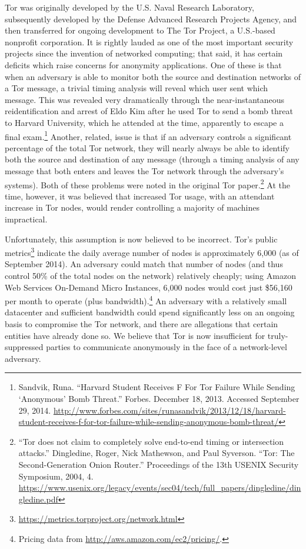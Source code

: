 \documentclass[12pt]{article}
\begin{document}
  Tor was originally developed by the U.S. Naval Research Laboratory, subsequently developed by the Defense Advanced Research Projects Agency, and then transferred for ongoing development to The Tor Project, a U.S.-based nonprofit corporation. It is rightly lauded as one of the most important security projects since the invention of networked computing; that said, it has certain deficits which raise concerns for anonymity applications. One of these is that when an adversary is able to monitor both the source and destination networks of a Tor message, a trivial timing analysis will reveal which user sent which message. This was revealed very dramatically through the near-instantaneous reidentification and arrest of Eldo Kim after he used Tor to send a bomb threat to Harvard University, which he attended at the time, apparently to escape a final exam.\footnote{Sandvik, Runa. ``Harvard Student Receives F For Tor Failure While Sending `Anonymous' Bomb Threat.'' Forbes. December 18, 2013. Accessed September 29, 2014. \url{http://www.forbes.com/sites/runasandvik/2013/12/18/harvard-student-receives-f-for-tor-failure-while-sending-anonymous-bomb-threat/}} Another, related, issue is that if an adversary controls a significant percentage of the total Tor network, they will nearly always be able to identify both the source and destination of any message (through a timing analysis of any message that both enters and leaves the Tor network through the adversary's systems). Both of these problems were noted in the original Tor paper.\footnote{``Tor does not claim to completely solve end-to-end timing or intersection attacks.'' Dingledine, Roger, Nick Mathewson, and Paul Syverson. ``Tor: The Second-Generation Onion Router.'' Proceedings of the 13th USENIX Security Symposium, 2004, 4. \url{https://www.usenix.org/legacy/events/sec04/tech/full_papers/dingledine/dingledine.pdf}} At the time, however, it was believed that increased Tor usage, with an attendant increase in Tor nodes, would render controlling a majority of machines impractical.
  
  Unfortunately, this assumption is now believed to be incorrect. Tor's public metrics\footnote{\url{https://metrics.torproject.org/network.html}} indicate the daily average number of nodes is approximately 6,000 (as of September 2014). An adversary could match that number of nodes (and thus control 50\% of the total nodes on the network) relatively cheaply; using Amazon Web Services On-Demand Micro Instances, 6,000 nodes would cost just \$56,160 per month to operate (plus bandwidth).\footnote{Pricing data from \url{http://aws.amazon.com/ec2/pricing/}.} An adversary with a relatively small datacenter and sufficient bandwidth could spend significantly less on an ongoing basis to compromise the Tor network, and there are allegations that certain entities have already done so. We believe that Tor is now insufficient for truly-suppressed parties to communicate anonymously in the face of a network-level adversary.
  
\end{document}
